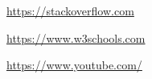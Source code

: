 \begin{thebibliography}{99999}
\singlespace\normalsize

  \url{https://stackoverflow.com}

  \url{https://www.w3schools.com}

  \url{https://www.youtube.com/}

\end{thebibliography}
